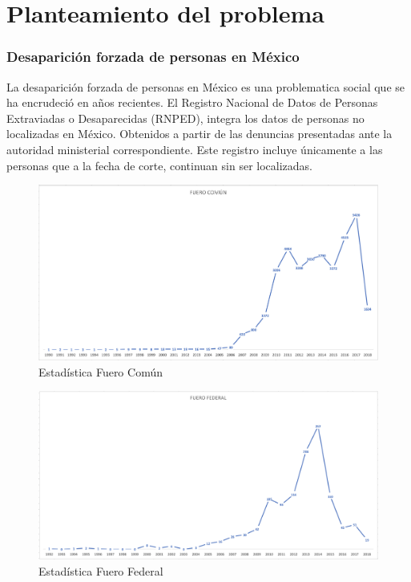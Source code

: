 \chapter{Planteamiento del problema}

\subsection{Desaparici\'on forzada de personas en México}

\justify
La desaparición forzada de personas en México es una problematica social que se ha encrudeció en años recientes. El Registro Nacional de Datos de Personas Extraviadas o Desaparecidas (RNPED), integra los datos de personas no localizadas en México. Obtenidos a partir de las denuncias presentadas ante la autoridad ministerial correspondiente. Este registro incluye únicamente a las personas que a la fecha de corte, continuan sin ser localizadas.





\begin{figure}[bp!]
	\centering
	\includegraphics[width=5in]{imgs/fuerocomun}
	  \caption{Estad\'istica Fuero Común}
\end{figure}

\begin{figure}[bp!]
	\centering
	\includegraphics[width=5in]{imgs/fuerofederal}
	  \caption{Estad\'istica Fuero Federal}
\end{figure}


